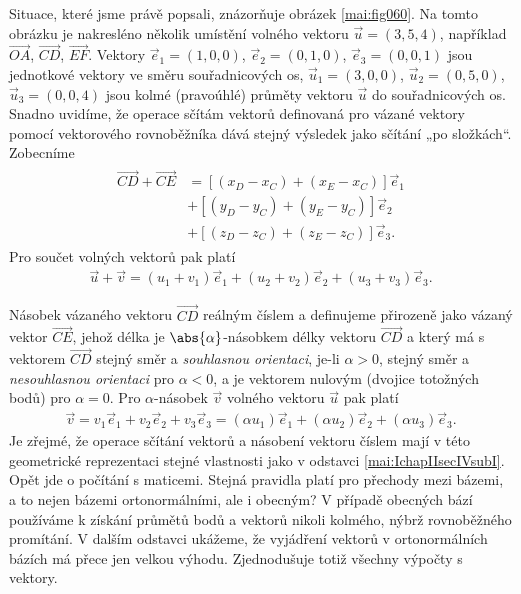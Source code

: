       Situace, které jsme právě popsali, znázorňuje obrázek \ref{mai:fig060}. Na tomto obrázku je
      nakresléno několik umístění volného vektoru \(\vec{u} = (3, 5, 4)\), například
      \(\overrightarrow{OA}\), \(\overrightarrow{CD}\), \(\overrightarrow{EF}\). Vektory \(\vec{e}_1 =
      (1, 0, 0)\), \(\vec{e}_2 = (0, 1, 0)\), \(\vec{e}_3 = (0, 0, 1)\) jsou jednotkové vektory ve
      směru souřadnicových os, \(\vec{u}_1 = (3, 0, 0)\), \(\vec{u}_2 = (0, 5, 0)\), \(\vec{u}_3 =
      (0, 0, 4)\) jsou kolmé (pravoúhlé) průměty vektoru \(\vec{u}\) do souřadnicových os. Snadno
      uvidíme, že operace sčítám vektorů definovaná pro vázané vektory pomocí vektorového rovnoběžníka
      dává stejný výsledek jako sčítání „po složkách“. Zobecníme
      \begin{gather*}
        \begin{align*}
        \overrightarrow{CD} + \overrightarrow{CE}  
          &= [(x_D - x_C) + (x_E - x_C)]\vec{e}_1                              \\
          &+ [(y_D - y_C) + (y_E - y_C)]\vec{e}_2                              \\
          &+ [(z_D - z_C) + (z_E - z_C)]\vec{e}_3.
        \end{align*}
      \end{gather*}
      Pro součet volných vektorů pak platí
      \begin{gather*}
        \vec{u} + \vec{v}= (u_1+v_1)\vec{e}_1 + (u_2+v_2)\vec{e}_2 + (u_3+v_3)\vec{e}_3.
      \end{gather*}

      Násobek vázaného vektoru \(\overrightarrow{CD}\) reálným číslem a definujeme přirozeně jako
      vázaný vektor \(\overrightarrow{CE}\), jehož délka je \(\abs{\alpha}\)-násobkem délky vektoru
      \(\overrightarrow{CD}\) a který má s vektorem \(\overrightarrow{CD}\) stejný směr a
      \emph{souhlasnou orientaci}, je-li \(\alpha > 0\), stejný směr a \emph{nesouhlasnou orientaci}
      pro \(\alpha < 0\), a je vektorem nulovým (dvojice totožných bodů) pro \(\alpha = 0\). Pro
      \(\alpha\)-násobek \(\vec{v}\) volného vektoru \(\vec{u}\) pak platí
      \begin{gather*}
        \vec{v} = v_1\vec{e}_1 + v_2\vec{e}_2 + v_3\vec{e}_3 
                =  (\alpha u_1)\vec{e}_1 + (\alpha u_2)\vec{e}_2 + (\alpha u_3)\vec{e}_3.
      \end{gather*}
      Je zřejmé, že operace sčítání vektorů a násobení vektoru číslem mají v této geometrické
      reprezentaci stejné vlastnosti jako v odstavci \ref{mai:IchapIIsecIVsubI}. Opět jde o počítání
      s maticemi. Stejná pravidla platí pro přechody mezi bázemi, a to nejen bázemi ortonormálními,
      ale i obecným? V případě obecných bází používáme k získání průmětů bodů a vektorů nikoli
      kolmého, nýbrž rovnoběžného promítání. V dalším odstavci ukážeme, že vyjádření vektorů v
      ortonormálních bázích má přece jen velkou výhodu. Zjednodušuje totiž všechny výpočty s
      vektory.

